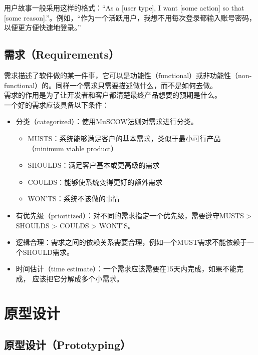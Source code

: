 用户故事一般采用这样的格式：“As a [user type], I want [some action] so that [some reason].”。例如，“作为一个活跃用户，我想不用每次登录都输入账号密码，以便更方便快速地登录。”\\

\subsection{需求（Requirements）}

需求描述了软件做的某一件事，它可以是功能性（functional）或非功能性（non-functional）的。同样一个需求只需要描述做什么，而不是如何去做。\\

需求的作用是为了让开发者和客户都清楚最终产品想要的预期是什么。\\

一个好的需求应该具备以下条件：

\begin{itemize}
    \item 分类（categorized）：使用MuSCOW法则对需求进行分类。
          \begin{itemize}
              \item MUSTS：系统能够满足客户的基本需求，类似于最小可行产品（minimum viable product）
              \item SHOULDS：满足客户基本或更高级的需求
              \item COULDS：能够使系统变得更好的额外需求
              \item WON'TS：系统不该做的事情
          \end{itemize}

    \item 有优先级（prioritized）：对不同的需求指定一个优先级，需要遵守MUSTS > SHOULDS > COULDS > WONT'S。

    \item 逻辑合理：需求之间的依赖关系需要合理，例如一个MUST需求不能依赖于一个SHOULD需求。

    \item 时间估计（time estimate）：一个需求应该需要在15天内完成，如果不能完成， 应该把它分解成多个小需求。
\end{itemize}

\newpage

\section{原型设计}

\subsection{原型设计（Prototyping）}

